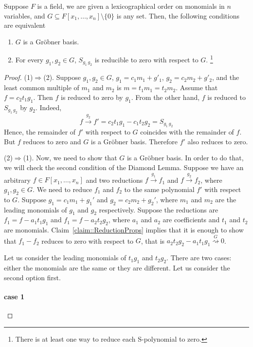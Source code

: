 \begin{claim}
Suppose $F$ is a field, we are given a lexicographical order on monomials in $n$ variables, and $G\subseteq F[x_1,\ldots,x_n]\setminus\{0\}$ is any set.
Then, the following conditions are equivalent
\begin{enumerate}
\item $G$ is a Gr\"obner basis.

\item For every $g_1,g_2\in G$, $S_{g_1\,g_2}$ is reducible to zero with respect to $G$.%
\footnote{There is at least one way to reduce each S-polynomial to zero.}
\end{enumerate}
\end{claim}
\begin{proof}
(1)$\Rightarrow$(2).
Suppose $g_1,g_2\in G$, $g_1 = c_1 m_1 + g'_1$, $g_2 = c_2m_2 + g'_2$, and the least common multiple of $m_1$ and $m_2$ is $m = t_1 m_1 = t_2 m_2$.
Assume that $f = c_2 t_1 g_1$.
Then $f$ is reduced to zero by $g_1$.
From the other hand, $f$ is reduced to $S_{g_1\,g_2}$ by $g_2$.
Indeed,
\[
f\stackrel{g_2}{\longrightarrow} f' = c_2 t_1 g_1 - c_1 t_2 g_2 = S_{g_1\,g_2}
\]
Hence, the remainder of $f'$ with respect to $G$ coincides with the remainder of $f$.
But $f$ reduces to zero and $G$ is a Gr\"obner basis.
Therefore $f'$ also reduces to zero.


(2)$\Rightarrow$(1).
Now, we need to show that $G$ is a Gr\"obner basis.
In order to do that, we will check the second condition of the Diamond Lemma.
Suppose we have an arbitrary $f\in F[x_1,\ldots,x_n]$ and two reductions $f \stackrel{g_1}{\longrightarrow}f_1$ and $f\stackrel{g_2}{\longrightarrow}f_2$, where $g_1,g_2\in G$.
We need to reduce $f_1$ and $f_2$ to the same polynomial $f'$ with respect to $G$.
Suppose $g_1 = c_1 m_1 + g_1'$ and $g_2 = c_2 m_2 + g_2'$, where $m_1$ and $m_2$ are the leading monomials of $g_1$ and $g_2$ respectively.
Suppose the reductions are $f_1 = f - a_1 t_1 g_1$ and $f_1 = f - a_2 t_2 g_2$, where $a_1$ and $a_2$ are coefficients and $t_1$ and $t_2$ are monomials.
Claim~\ref{claim::ReductionProps} implies that it is enough to show that $f_1 - f_2$ reduces to zero with respect to $G$, that is $a_2t_2g_2 - a_1 t_1 g_1 \stackrel{G}{\rightsquigarrow}0$.

Let us consider the leading monomials of $t_1g_1$ and $t_2 g_2$.
There are two cases: either the monomials are the same or they are different.
Let us consider the second option first.

\paragraph{case 1}


\end{proof}
